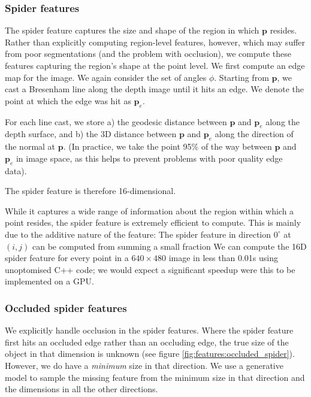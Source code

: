 \documentclass[10pt,twocolumn,letterpaper]{article}
\newcommand{\point}{\mathbf{p}}
\newcommand{\degree}{^{\circ}}
\begin{document}
\subsubsection{Spider features}
The spider feature captures the size and shape of the region in which $\point$ resides. 
Rather than explicitly computing region-level features, however, which may suffer from poor segmentations (and the problem with occlusion), we compute these features capturing the region's shape at the point level. 
We first compute an edge map for the image.
We again consider the set of angles $\phi$. Starting from $\point$, we cast a Bresenham line along the depth image until it hits an edge. 
We denote the point at which the edge was hit as $\point_{e}$.

For each line cast, we store
a) the geodesic distance between $\point$ and $\point_{e}$ along the depth surface, and 
b) the 3D distance between $\point$ and $\point_{e}$ along the direction of the normal at $\point$. (In practice, we take the point 95\% of the way between $\point$ and $\point_{e}$ in image space, as this helps to prevent problems with poor quality edge data).

The spider feature is therefore 16-dimensional.

While it captures a wide range of information about the region within which a point resides, the spider feature is extremely efficient to compute.
This is mainly due to the additive nature of the feature: The spider feature in direction $0\degree$ at $(i, j)$ can be computed from summing a small fraction 
We can compute the 16D spider feature for every point in a $640\times480$ image in less than 0.01s using unoptomised C++ code; we would expect a significant speedup were this to be implemented on a GPU.

\subsubsection{Occluded spider features}

We explicitly handle occlusion in the spider features. Where the spider feature first hits an occluded edge rather than an occluding edge, the true size of the object in that dimension is unknown (see figure \ref{fig:features:occluded_spider}).
However, we do have a \textit{minimum} size in that direction.
We use a generative model to sample the missing feature from the minimum size in that direction and the dimensions in all the other directions.

\end{document}
